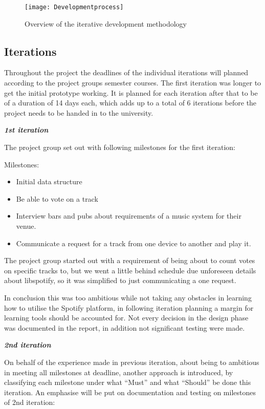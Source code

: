 \begin{figure}[hbtp]
  \centering
  \texttt{[image: Developmentprocess]}
  \caption{Overview of the iterative development methodology}\label{fig:developmentprocess}
\end{figure}

\subsection{Iterations}

Throughout the project the deadlines of the individual iterations will planned according to the project groups semester courses. The first iteration was longer to get the initial prototype working. It is planned for each iteration after that to be of a duration of 14 days each, which adds up to a total of 6 iterations before the project needs to be handed in to the university.

\textit{\textbf{1st iteration}}

	The project group set out with following milestones for the first iteration:

	Milestones:
	\begin{itemize}
		\item Initial data structure
		\item Be able to vote on a track
		\item Interview bars and pubs about requirements of a music system for their venue.
		\item Communicate a request for a track from one device to another and play it.
	\end{itemize}

	The project group started out with a requirement of being about to count votes on specific tracks to, but we went a little behind schedule due unforeseen details about libspotify, so it was simplified to just communicating a one request.

	In conclusion this was too ambitious while not taking any obstacles in learning how to utilise the Spotify platform, in following iteration planning a margin for learning tools should be accounted for. Not every decision in the design phase was documented in the report, in addition not significant testing were made.

\noindent\textit{\textbf{2nd iteration}}

	On behalf of the experience made in previous iteration, about being to ambitious in meeting all milestones at deadline, another approach is introduced, by classifying each milestone under what \enquote{Must} and what \enquote{Should} be done this iteration. An emphasise will be put on documentation and testing on milestones of 2nd iteration:

